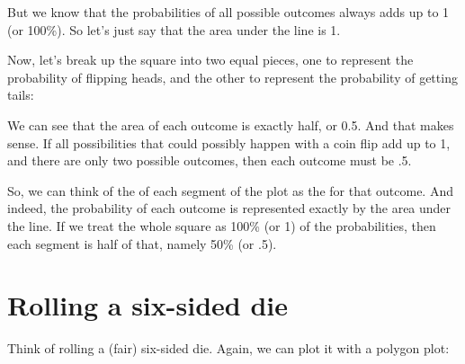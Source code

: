 \documentclass[../../../main.tex]{subfiles}
\begin{document}
But we know that the probabilities of all possible outcomes always adds up to 1 (or 100\%). So let's just say that the area under the line is 1.

Now, let's break up the square into two equal pieces, one to represent the probability of flipping heads, and the other to represent the probability of getting tails:

\begin{center}
\end{center}

We can see that the area of each outcome is exactly half, or 0.5. And that makes sense. If all possibilities that could possibly happen with a coin flip add up to 1, and there are only two possible outcomes, then each outcome must be .5.

So, we can think of the  of each segment of the plot as the  for that outcome. And indeed, the probability of each outcome is represented exactly by the area under the line. If we treat the whole square as 100\% (or 1) of the probabilities, then each segment is half of that, namely 50\% (or .5).


\section{Rolling a six-sided die}

Think of rolling a (fair) six-sided die. Again, we can plot it with a polygon plot: 
\end{document}
